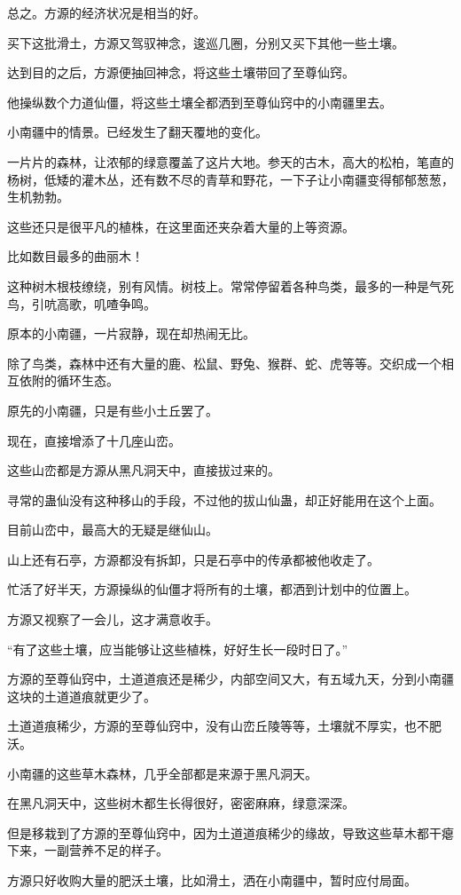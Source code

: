 \begin{this_body}
总之。方源的经济状况是相当的好。

买下这批滑土，方源又驾驭神念，逡巡几圈，分别又买下其他一些土壤。

达到目的之后，方源便抽回神念，将这些土壤带回了至尊仙窍。

他操纵数个力道仙僵，将这些土壤全都洒到至尊仙窍中的小南疆里去。

小南疆中的情景。已经发生了翻天覆地的变化。

一片片的森林，让浓郁的绿意覆盖了这片大地。参天的古木，高大的松柏，笔直的杨树，低矮的灌木丛，还有数不尽的青草和野花，一下子让小南疆变得郁郁葱葱，生机勃勃。

这些还只是很平凡的植株，在这里面还夹杂着大量的上等资源。

比如数目最多的曲丽木！

这种树木根枝缭绕，别有风情。树枝上。常常停留着各种鸟类，最多的一种是气死鸟，引吭高歌，叽喳争鸣。

原本的小南疆，一片寂静，现在却热闹无比。

除了鸟类，森林中还有大量的鹿、松鼠、野兔、猴群、蛇、虎等等。交织成一个相互依附的循环生态。

原先的小南疆，只是有些小土丘罢了。

现在，直接增添了十几座山峦。

这些山峦都是方源从黑凡洞天中，直接拔过来的。

寻常的蛊仙没有这种移山的手段，不过他的拔山仙蛊，却正好能用在这个上面。

目前山峦中，最高大的无疑是继仙山。

山上还有石亭，方源都没有拆卸，只是石亭中的传承都被他收走了。

忙活了好半天，方源操纵的仙僵才将所有的土壤，都洒到计划中的位置上。

方源又视察了一会儿，这才满意收手。

“有了这些土壤，应当能够让这些植株，好好生长一段时日了。”

方源的至尊仙窍中，土道道痕还是稀少，内部空间又大，有五域九天，分到小南疆这块的土道道痕就更少了。

土道道痕稀少，方源的至尊仙窍中，没有山峦丘陵等等，土壤就不厚实，也不肥沃。

小南疆的这些草木森林，几乎全部都是来源于黑凡洞天。

在黑凡洞天中，这些树木都生长得很好，密密麻麻，绿意深深。

但是移栽到了方源的至尊仙窍中，因为土道道痕稀少的缘故，导致这些草木都干瘪下来，一副营养不足的样子。

方源只好收购大量的肥沃土壤，比如滑土，洒在小南疆中，暂时应付局面。


\end{this_body}
